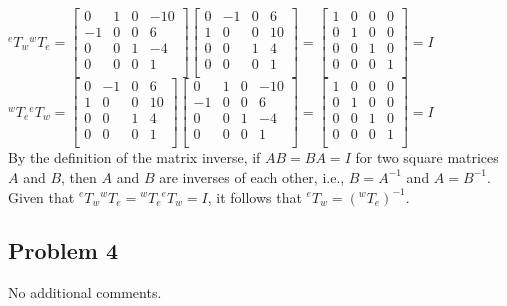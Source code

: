 \documentclass[12pt,letterpaper]{article}
\begin{document}
\begin{enumerate}
${^{e}T_w} {^{w}T_e} = 
\begin{bmatrix}
 0 & 1 & 0 & -10\\
-1 & 0 & 0 &   6\\
 0 & 0 & 1 &  -4\\
 0 & 0 & 0 &   1\\
\end{bmatrix}
\begin{bmatrix}
0 & -1 & 0 &  6\\
1 &  0 & 0 & 10\\
0 &  0 & 1 &  4\\
0 &  0 & 0 &  1\\
\end{bmatrix}
= \begin{bmatrix} 1 & 0 & 0 & 0\\ 0 & 1 & 0 & 0\\ 0 & 0 & 1 & 0\\ 0 & 0 & 0 & 1\\ \end{bmatrix} 
= I$\\

${^{w}T_e} {^{e}T_w} = 
\begin{bmatrix}
0 & -1 & 0 &  6\\
1 &  0 & 0 & 10\\
0 &  0 & 1 &  4\\
0 &  0 & 0 &  1\\
\end{bmatrix}
\begin{bmatrix}
 0 & 1 & 0 & -10\\
-1 & 0 & 0 &   6\\
 0 & 0 & 1 &  -4\\
 0 & 0 & 0 &   1\\
\end{bmatrix}
= \begin{bmatrix} 1 & 0 & 0 & 0\\ 0 & 1 & 0 & 0\\ 0 & 0 & 1 & 0\\ 0 & 0 & 0 & 1\\ \end{bmatrix} 
= I$\\

By the definition of the matrix inverse, if $AB = BA = I$ for two square matrices $A$ and $B$, then $A$ and $B$ are inverses of each other, i.e., $B = A^{-1}$ and $A = B^{-1}$.\\

Given that ${^{e}T_w} {^{w}T_e} = {^{w}T_e} {^{e}T_w} = I$, it follows that ${^{e}T_w} = ({^{w}T_e})^{-1}$.

\end{enumerate}

\subsection*{Problem 4}

No additional comments.
\end{document}
